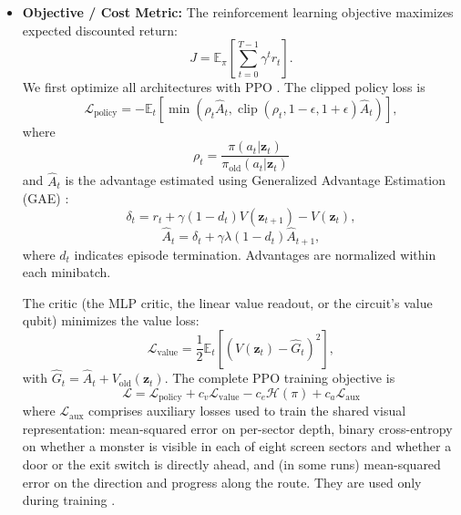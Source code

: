\documentclass[10pt, a4paper]{article}
\begin{document}
\begin{itemize}
    \item \textbf{Objective / Cost Metric:}
    The reinforcement learning objective maximizes
    expected discounted return:
    \begin{equation}
        J=\mathbb{E}_{\pi}
        \left[\sum_{t=0}^{T-1}\gamma^t r_t\right].
    \end{equation}
    We first optimize all architectures with PPO \cite{schulman_ppo_2017}.
    The clipped policy loss is
    \begin{equation}
        \mathcal{L}_{\mathrm{policy}} =
        -\mathbb{E}_t\left[
        \min\left(
        \rho_t\hat{A}_t,
        \operatorname{clip}(\rho_t,1-\epsilon,1+\epsilon)
        \hat{A}_t\right)\right],
    \end{equation}
    where
    \begin{equation}
        \rho_t =
        \frac{\pi(a_t|\mathbf{z}_t)}
        {\pi_{\mathrm{old}}(a_t|\mathbf{z}_t)}
    \end{equation}
    and $\hat{A}_t$ is the advantage estimated using
    Generalized Advantage Estimation (GAE) \cite{schulman_gae_2016}:
    \begin{equation}
        \delta_t=r_t+\gamma(1-d_t)V(\mathbf{z}_{t+1})
        -V(\mathbf{z}_t),
    \end{equation}
    \begin{equation}
        \hat{A}_t=\delta_t+
        \gamma\lambda(1-d_t)\hat{A}_{t+1},
    \end{equation}
    where $d_t$ indicates episode termination.
    Advantages are normalized within each minibatch.

    The critic (the MLP critic, the linear value readout, or the circuit's value qubit) minimizes the value loss:
    \begin{equation}
        \mathcal{L}_{\mathrm{value}}=
        \frac{1}{2}\mathbb{E}_t
        \left[(V(\mathbf{z}_t)-\hat{G}_t)^2\right],
    \end{equation}
    with $\hat{G}_t=\hat{A}_t+V_{\mathrm{old}}
    (\mathbf{z}_t)$.
    The complete PPO training objective is
    \begin{equation}
        \boxed{
        \mathcal{L}=
        \mathcal{L}_{\mathrm{policy}}
        +c_v\mathcal{L}_{\mathrm{value}}
        -c_e\mathcal{H}(\pi)
        +c_a\mathcal{L}_{\mathrm{aux}}
        }
    \end{equation}
    where $\mathcal{L}_{\mathrm{aux}}$ comprises
    auxiliary losses used to train the shared visual representation: mean-squared error on per-sector depth,
    binary cross-entropy on whether a monster is visible in each of eight screen sectors and whether a door
    or the exit switch is directly ahead, and (in some runs) mean-squared error on the direction and progress along the route.
    They are used only during training \cite{mirowski_navigate_2017,lample_fps_2017}.


\end{itemize}
\end{document}
